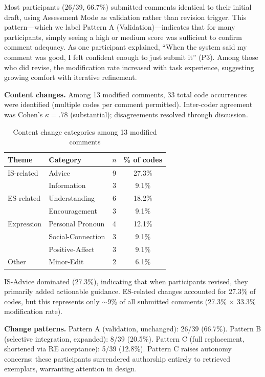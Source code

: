 \documentclass[]{llncs}
\begin{document}
Most participants (26/39, 66.7\%) submitted comments identical to their 
initial draft, using Assessment Mode as validation rather than revision 
trigger. This pattern---which we label Pattern A (Validation)---indicates 
that for many participants, simply seeing a high or medium score was 
sufficient to confirm comment adequacy. As one participant explained, 
``When the system said my comment was good, I felt confident enough to 
just submit it'' (P3). Among those who did revise, the modification rate 
increased with task experience, suggesting growing comfort with iterative 
refinement.

\textbf{Content changes.} Among 13 modified comments, 33 total code 
occurrences were identified (multiple codes per comment permitted). 
Inter-coder agreement was Cohen's $\kappa = .78$ (substantial); 
disagreements resolved through discussion.

\begin{table}[htbp]
\centering
\caption{Content change categories among 13 modified comments}
\label{tab:coding}
\begin{tabular}{llcc}
\hline
Theme & Category & $n$ & \% of codes \\
\hline
IS-related & Advice & 9 & 27.3\% \\
 & Information & 3 & 9.1\% \\
ES-related & Understanding & 6 & 18.2\% \\
 & Encouragement & 3 & 9.1\% \\
Expression & Personal Pronoun & 4 & 12.1\% \\
 & Social-Connection & 3 & 9.1\% \\
 & Positive-Affect & 3 & 9.1\% \\
Other & Minor-Edit & 2 & 6.1\% \\
\hline
\end{tabular}
\end{table}

IS-Advice dominated (27.3\%), indicating that when participants revised, 
they primarily added actionable guidance. ES-related changes accounted 
for 27.3\% of codes, but this represents only $\sim$9\% of all submitted 
comments (27.3\% $\times$ 33.3\% modification rate).

\textbf{Change patterns.} Pattern A (validation, unchanged): 26/39 
(66.7\%). Pattern B (selective integration, expanded): 8/39 (20.5\%). 
Pattern C (full replacement, shortened via RE acceptance): 5/39 (12.8\%). 
Pattern C raises autonomy concerns: these participants surrendered 
authorship entirely to retrieved exemplars, warranting attention in 
design.
\end{document}
